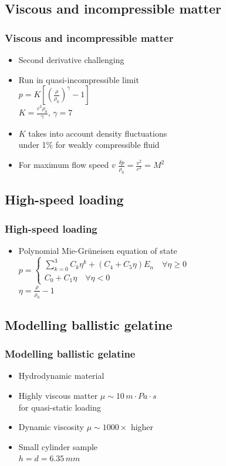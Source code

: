 \documentclass{beamer}
\begin{document}
\subsection{Viscous and incompressible matter}
\begin{frame}
\frametitle{Viscous and incompressible matter}
\begin{itemize}
\item Second derivative challenging
\item Run in quasi-incompressible limit \\
$p=K\left[\left(\frac{\rho}{\rho_0}\right)^\gamma-1\right]$ \\
$K=\frac{c^2\rho_0}{\gamma}$, $\gamma=7$
\item $K$ takes into account density fluctuations \\ under 1\% for weakly compressible fluid
\item For maximum flow speed $v$ $\frac{\delta p}{\rho_0}=\frac{v^2}{c^2}=M^2$
\end{itemize}
\end{frame}

\subsection{High-speed loading}
\begin{frame}
\frametitle{High-speed loading}
\begin{itemize}
\item Polynomial Mie-Gr\"uneisen equation of state
$p=\left\{\begin{matrix}
\sum\limits_{k=0}^3 C_k\eta^k+\left(C_4+C_5\eta\right)E_n\quad\forall\eta\ge 0\\
C_0+C_1\eta\quad\forall\eta<0
\end{matrix}\right.$ \\
$\eta=\frac{\rho}{\rho_0}-1$
\end{itemize}
\end{frame}

\subsection{Modelling ballistic gelatine}
\begin{frame}
\frametitle{Modelling ballistic gelatine}
\begin{itemize}
\item Hydrodynamic material
\item Highly viscous matter $\mu\sim 10\,m\cdot Pa\cdot s$ \\ for quasi-static loading
\item Dynamic viscosity $\mu\sim1000\times$ higher
\item Small cylinder sample \\ $h=d=6.35\,mm$
\end{itemize}
\end{frame}
\end{document}
